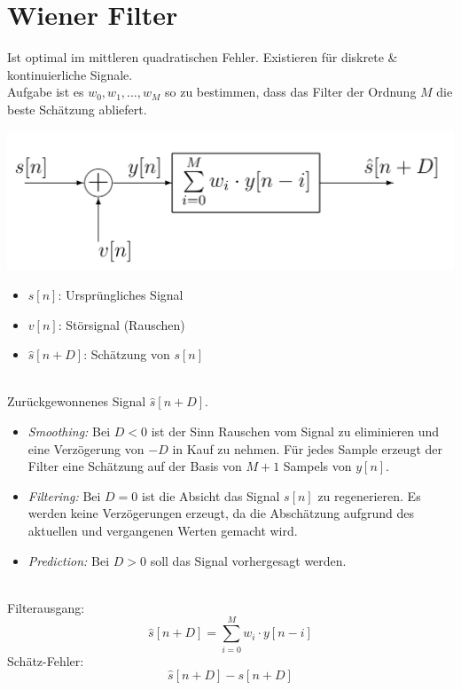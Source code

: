 \section{Wiener Filter}
Ist optimal im mittleren quadratischen Fehler. Existieren für diskrete \& kontinuierliche Signale.\\
Aufgabe ist es $w_0,w_1,...,w_M$ so zu bestimmen, dass das Filter der Ordnung $M$ die beste Schätzung abliefert.\\
\begin{minipage}{.50\textwidth}
	\centering
	\includegraphics[width=\textwidth]{../fig/wiener_filter}
\end{minipage}
\begin{minipage}{.41\textwidth}
	\begin{itemize}[itemsep=1pt,topsep=3pt]
		\item $s[n]$: Ursprüngliches Signal
		\item $v[n]$: Störsignal (Rauschen)
		\item $\hat{s}[n+D]$: Schätzung von $s[n]$
	\end{itemize}	
\end{minipage}
~\\
Zurückgewonnenes Signal $\hat{s}[n+D]$.
\begin{itemize}[itemsep=1pt,topsep=3pt]
	\item \textit{Smoothing:} Bei $D<0$ ist der Sinn Rauschen vom Signal zu
	eliminieren und eine Verzögerung von $-D$ in Kauf zu nehmen. Für jedes Sample
	erzeugt der Filter eine Schätzung auf der Basis von $M+1$ Sampels von $y[n]$.
	\item \textit{Filtering:} Bei $D=0$ ist die Absicht das Signal $s[n]$ zu regenerieren.
	Es werden keine Verzögerungen erzeugt, da die Abschätzung aufgrund des 
	aktuellen und vergangenen Werten gemacht wird.
	\item \textit{Prediction:} Bei $D>0$ soll das Signal vorhergesagt werden.
\end{itemize} 
~\\
Filterausgang:
\[ \hat{s}[n+D] = \sum_{i=0}^{M}w_i\cdot y[n-i] \]
Schätz-Fehler:
\[ \hat{s}[n+D] - s[n+D] \]
